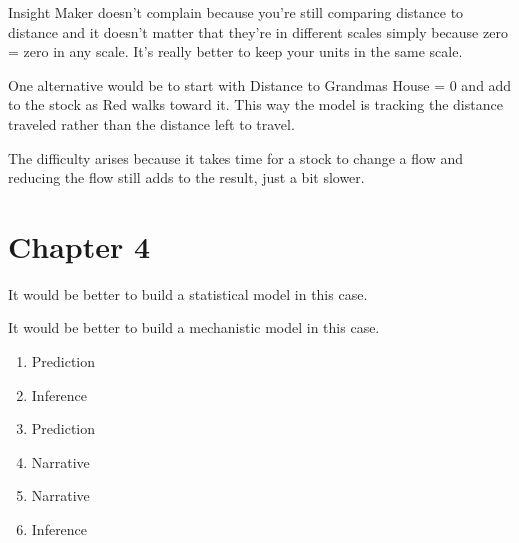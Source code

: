 \documentclass[]{memoir}
\begin{document}
Insight Maker doesn't complain because you're still comparing distance
to distance and it doesn't matter that they're in different scales
simply because zero = zero in any scale. It's really better to keep your
units in the same scale.


One alternative would be to start with Distance to Grandmas House = 0
and add to the stock as Red walks toward it. This way the model is
tracking the distance traveled rather than the distance left to travel.


The difficulty arises because it takes time for a stock to change a flow
and reducing the flow still adds to the result, just a bit slower.

\section{Chapter 4}


It would be better to build a statistical model in this case.


It would be better to build a mechanistic model in this case.


\begin{enumerate}
\def\labelenumi{\arabic{enumi}.}
\itemsep1pt\parskip0pt
\item
  Prediction
\item
  Inference
\item
  Prediction
\item
  Narrative
\item
  Narrative
\item
  Inference
\end{enumerate}
\end{document}
